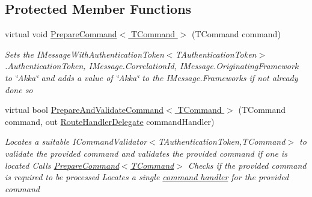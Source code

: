 \subsection*{Protected Member Functions}
\begin{DoxyCompactItemize}
\item 
virtual void \hyperlink{classCqrs_1_1Akka_1_1Commands_1_1AkkaCommandBus_a9755a84c0b971ce0862abdc2783422ce_a9755a84c0b971ce0862abdc2783422ce}{Prepare\+Command$<$ T\+Command $>$} (T\+Command command)
\begin{DoxyCompactList}\small\item\em Sets the I\+Message\+With\+Authentication\+Token$<$\+T\+Authentication\+Token$>$.\+Authentication\+Token, I\+Message.\+Correlation\+Id, I\+Message.\+Originating\+Framework to \char`\"{}\+Akka\char`\"{} and adds a value of \char`\"{}\+Akka\char`\"{} to the I\+Message.\+Frameworks if not already done so \end{DoxyCompactList}\item 
virtual bool \hyperlink{classCqrs_1_1Akka_1_1Commands_1_1AkkaCommandBus_ae3e5f1725bceb0359aedb74ded530858_ae3e5f1725bceb0359aedb74ded530858}{Prepare\+And\+Validate\+Command$<$ T\+Command $>$} (T\+Command command, out \hyperlink{classCqrs_1_1Bus_1_1RouteHandlerDelegate}{Route\+Handler\+Delegate} command\+Handler)
\begin{DoxyCompactList}\small\item\em Locates a suitable I\+Command\+Validator$<$\+T\+Authentication\+Token,\+T\+Command$>$ to validate the provided {\itshape command}  and validates the provided {\itshape command}  if one is located Calls \hyperlink{classCqrs_1_1Akka_1_1Commands_1_1AkkaCommandBus_a9755a84c0b971ce0862abdc2783422ce_a9755a84c0b971ce0862abdc2783422ce}{Prepare\+Command$<$\+T\+Command$>$} Checks if the provided {\itshape command}  is required to be processed Locates a single \hyperlink{}{command handler} for the provided {\itshape command}  \end{DoxyCompactList}\end{DoxyCompactItemize}
